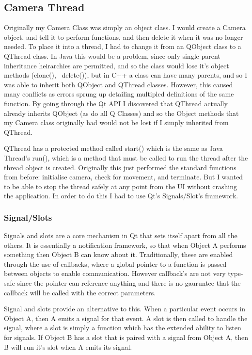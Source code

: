 \subsection{Camera Thread}
Originally my Camera Class was simply an object class. I would create a Camera object, and tell it to perform functions, and then delete it when it was no longer needed. To place it into a thread, I had to change it from an QObject class to a QThread class. In Java this would be a problem, since only single-parent inheritance heirarchies are permitted, and so the class would lose it's object methods (clone(), ~delete()), but in C++ a class can have many parents, and so I was able to inherit both QObject and QThread classes.
However, this caused many conflicts as errors sprung up detailing multipled definitions of the same function. By going through the Qt API I discovered that QThread actually already inherits QObject (as do all Q Classes) and so the Object methods that my Camera class originally had would not be lost if I simply inherited from QThread.

QThread has a protected method called start() which is the same as Java Thread's run(), which is a method that must be called to run the thread after the thread object is created. Originally this just performed the standard functions from before:  initialise camera, check for movement, and terminate. But I wanted to be able to stop the thread safely at any point from the UI without crashing the application. In order to do this I had to use Qt's Signals/Slot's framework.

\subsubsection{Signal/Slots}
Signals and slots are a core mechanism in Qt that sets itself apart from all the others. It is essentially a notification framework, so that when Object A performs something then Object B can know about it.  Traditionally, these are enabled through the use of callbacks, where a global pointer to a function is passed between objects to enable communication. However callback's are not very type-safe since the pointer can reference anything and there is no gauruntee that the callback will be called with the correct parameters.

Signal and slots provide an alternative to this. When a particular event occurs in Object A, then A emits a signal for that event. A slot  is then called to handle the signal, where a slot is simply a function which has the extended ability to listen for signals. If Object B has a slot that is paired with a signal from Object A, then  B will run it's slot when A emits its signal.

